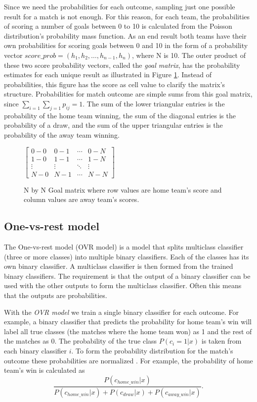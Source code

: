 Since we need the probabilities for each outcome, sampling just one possible result for a match is not enough. For this reason, for each team, the probabilities of scoring a number of goals between 0 to 10 is calculated from the Poisson distribution's probability mass function. As an end result both teams have their own probabilities for scoring goals between 0 and 10 in the form of a probability vector $score\_prob = \left( h _ { 1 } , h _ { 2 } , \dots , h _ { n - 1 } , h _ { n } \right)$, where N is 10. The outer product of these two score probability vectors, called the \textit{goal matrix}, has the probability estimates for each unique result as illustrated in Figure \ref{fig:goal_matrix}. Instead of probabilities, this figure has the score as cell value to clarify the matrix's structure. Probabilities for match outcome are simple sums from this goal matrix, since $\sum_{i=1}\sum_{j=1}p_{ij} = 1$. The sum of the lower triangular entries is the probability of the home team winning, the sum of the diagonal entries is the probability of a draw, and the sum of the upper triangular entries is the probability of the away team winning.
\begin{figure}
    $\begin{bmatrix}
    0-0 & 0-1 & \cdots & 0-N \\
    1-0 & 1-1 & \cdots   &1-N \\
    \vdots & \vdots   & \ddots & \vdots \\
    N-0 & N-1 & \cdots & N-N\end{bmatrix}$
\caption{N by N Goal matrix where row values are home team's score and column values are away team's scores.}
\label{fig:goal_matrix}
\end{figure}

\subsection{One-vs-rest model}
The One-vs-rest model (OVR model) is a model that splits multiclass classifier (three or more classes) into multiple binary classifiers. Each of the classes has its own binary classifier. A multiclass classifier is then formed from the trained binary classifiers. The requirement is that the output of a binary classifier can be used with the other outputs to form the multiclass classifier. Often this means that the outputs are probabilities.

With the \textit{OVR model} we train a single binary classifier for each outcome. For example, a binary classifier that predicts the probability for home team's win will label all true classes (the matches where the home team won) as 1 and the rest of the matches as 0. The probability of the true class $P(c_i = 1 | x)$ is taken from each binary classifier $i$. To form the probability distribution for the match's outcome these probabilities are normalized \cite{zadrozny2002transforming}. For example, the probability of home team's win is calculated as
\begin{equation}
\frac{P(c_{home\_win}| x)}{P(c_{home\_win}| x) + P(c_{draw}| x) + P(c_{away\_win}| x)} \text{.}
\end{equation}

